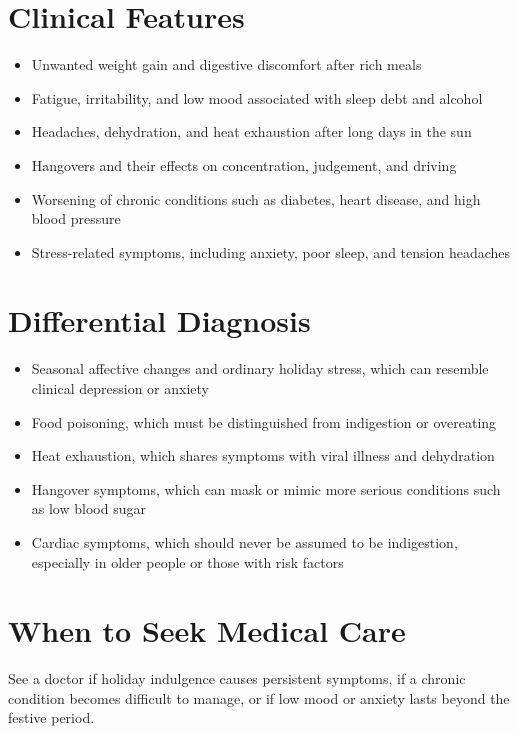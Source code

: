 \section*{Clinical Features}
\begin{itemize}
    \item Unwanted weight gain and digestive discomfort after rich meals
    \item Fatigue, irritability, and low mood associated with sleep debt and alcohol
    \item Headaches, dehydration, and heat exhaustion after long days in the sun
    \item Hangovers and their effects on concentration, judgement, and driving
    \item Worsening of chronic conditions such as diabetes, heart disease, and high blood pressure
    \item Stress-related symptoms, including anxiety, poor sleep, and tension headaches
\end{itemize}

\section*{Differential Diagnosis}
\begin{itemize}
    \item Seasonal affective changes and ordinary holiday stress, which can resemble clinical depression or anxiety
    \item Food poisoning, which must be distinguished from indigestion or overeating
    \item Heat exhaustion, which shares symptoms with viral illness and dehydration
    \item Hangover symptoms, which can mask or mimic more serious conditions such as low blood sugar
    \item Cardiac symptoms, which should never be assumed to be indigestion, especially in older people or those with risk factors
\end{itemize}

\section*{When to Seek Medical Care}
See a doctor if holiday indulgence causes persistent symptoms, if a chronic condition becomes difficult to manage, or if low mood or anxiety lasts beyond the festive period.

